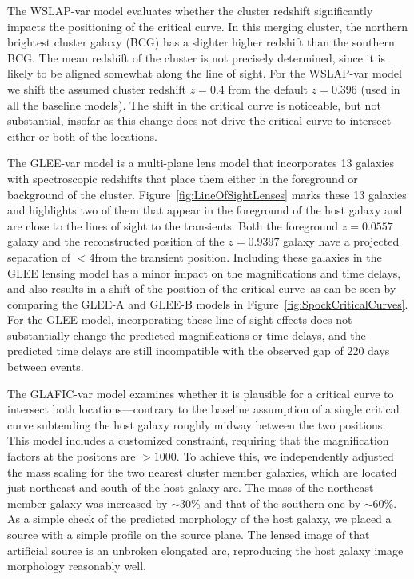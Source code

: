 The WSLAP-var model evaluates whether the cluster redshift
significantly impacts the positioning of the critical curve. In this
merging cluster, the northern brightest cluster galaxy (BCG) has a
slighter higher redshift than the southern BCG. The mean redshift of
the cluster is not precisely determined, since it is likely to be
aligned somewhat along the line of sight.  For the WSLAP-var model we
shift the assumed cluster redshift $z=0.4$ from the default $z=0.396$
(used in all the baseline models).  The shift in the critical curve is
noticeable, but not substantial, insofar as this change does not drive
the critical curve to intersect either or both of the \spock
locations.

The GLEE-var model is a multi-plane lens model that incorporates 13
galaxies with spectroscopic redshifts that place them either in the
foreground or background of the  cluster.
Figure~\ref{fig:LineOfSightLenses} marks these 13 galaxies and
highlights two of them that appear in the foreground of the \spock
host galaxy and are close to the lines of sight to the \spock
transients. Both the foreground $z=0.0557$ galaxy and the
reconstructed position of the $z=0.9397$ galaxy have a projected
separation of $<$4\arcsec from the \spocktwo transient position.
Including these galaxies in the GLEE lensing model has a minor impact
on the magnifications and time delays, and also results in a shift of
the position of the critical curve--as can be seen by comparing the
GLEE-A and GLEE-B models in Figure~\ref{fig:SpockCriticalCurves}.  For the
GLEE model, incorporating these line-of-sight effects does not
substantially change the predicted magnifications or time delays, and
the predicted time delays are still incompatible with the observed gap
of 220 days between events.

The GLAFIC-var model examines whether it is plausible for a critical
curve to intersect both \spock locations---contrary to the baseline
assumption of a single critical curve subtending the \spock host
galaxy roughly midway between the two positions.  This model includes
a customized constraint, requiring that the magnification factors at
the \spock positons are $>1000$.  To achieve this, we independently
adjusted the mass scaling for the two nearest cluster member galaxies,
which are located just northeast and south of the \spock host galaxy
arc.  The mass of the northeast member galaxy was increased by
$\sim$30\% and that of the southern one by $\sim$60\%.  As a simple
check of the predicted morphology of the host galaxy, we placed a
source with a simple \citet{Sersic:1963} profile on the source
plane. The lensed image of that artificial source is an unbroken
elongated arc, reproducing the host galaxy image morphology reasonably
well.


